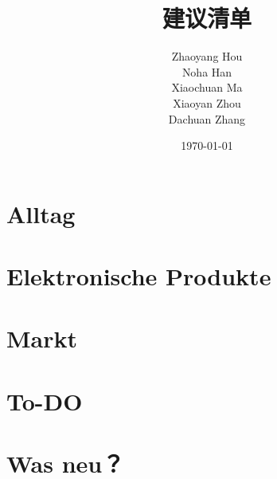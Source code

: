 \documentclass[12pt]{scrartcl}
\title{建议清单}
\author{Zhaoyang Hou \\Noha Han \\Xiaochuan Ma \\Xiaoyan Zhou \\Dachuan Zhang}
\date{\today}
\begin{document}
	\maketitle
	\newpage
	\tableofcontents
	\newpage
	\setcounter{page}{1}
	\section{Alltag}
	
	\section{Elektronische Produkte}
	
	\section{Markt}
	
	\newpage
	\section{To-DO}
	
	\section{Was neu？}
	

	
\end{document}
